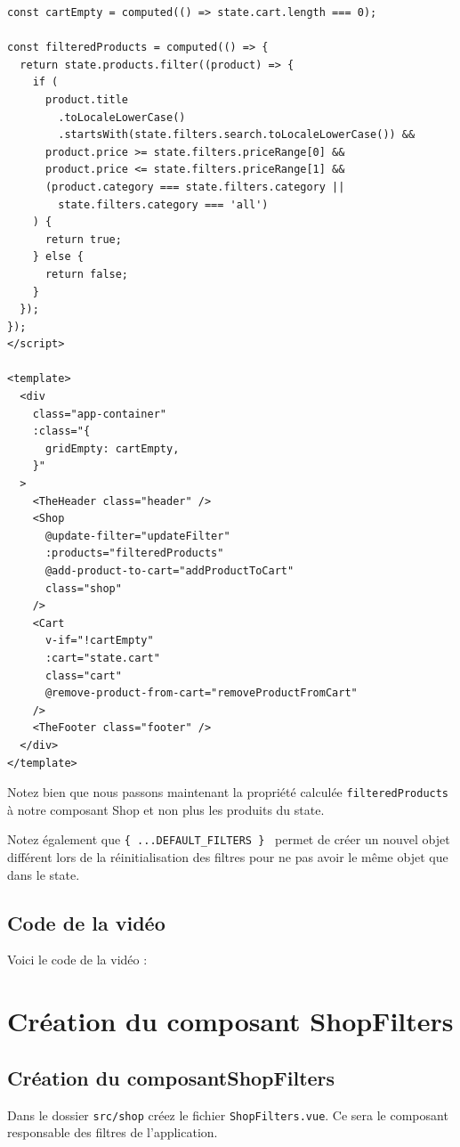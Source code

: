 \begin{verbatim}
const cartEmpty = computed(() => state.cart.length === 0);

const filteredProducts = computed(() => {
  return state.products.filter((product) => {
    if (
      product.title
        .toLocaleLowerCase()
        .startsWith(state.filters.search.toLocaleLowerCase()) &&
      product.price >= state.filters.priceRange[0] &&
      product.price <= state.filters.priceRange[1] &&
      (product.category === state.filters.category ||
        state.filters.category === 'all')
    ) {
      return true;
    } else {
      return false;
    }
  });
});
</script>

<template>
  <div
    class="app-container"
    :class="{
      gridEmpty: cartEmpty,
    }"
  >
    <TheHeader class="header" />
    <Shop
      @update-filter="updateFilter"
      :products="filteredProducts"
      @add-product-to-cart="addProductToCart"
      class="shop"
    />
    <Cart
      v-if="!cartEmpty"
      :cart="state.cart"
      class="cart"
      @remove-product-from-cart="removeProductFromCart"
    />
    <TheFooter class="footer" />
  </div>
</template>
\end{verbatim}
Notez bien que nous passons maintenant la propriété calculée {\tt filteredProducts} à notre composant Shop et non plus les produits du {\color{monOrange}state}.

Notez également que {\tt \{ ...DEFAULT\_FILTERS \} } permet de créer un nouvel objet différent lors de la réinitialisation des filtres pour ne pas avoir le même objet que dans le {\color{monOrange}state}.

\subsection{Code de la vidéo}
Voici le code de la vidéo :

\section{Création du composant ShopFilters}
\subsection{Création du composantShopFilters}
Dans le dossier {\tt src/shop} créez le fichier {\tt ShopFilters.vue}. Ce sera le composant responsable des filtres de l’application.

